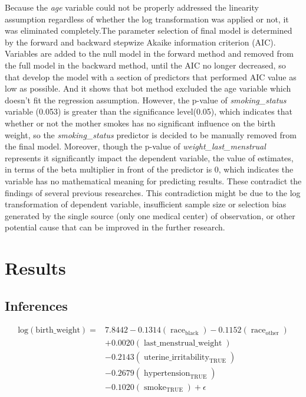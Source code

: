 \documentclass[9pt,twocolumn,twoside,]{pnas-new}
\begin{document}
Because the \emph{age} variable could not be properly addressed the
linearity assumption regardless of whether the log transformation was
applied or not, it was eliminated completely.The parameter selection of
final model is determined by the forward and backward stepwize Akaike
information criterion (AIC). Variables are added to the null model in
the forward method and removed from the full model in the backward
method, until the AIC no longer decreased, so that develop the model
with a section of predictors that performed AIC value as low as
possible. And it shows that bot method excluded the age variable which
doesn't fit the regression assumption. However, the p-value of
\emph{smoking\_status} variable (0.053) is greater than the significance
level(0.05), which indicates that whether or not the mother smokes has
no significant influence on the birth weight, so the
\emph{smoking\_status} predictor is decided to be manually removed from
the final model. Moreover, though the p-value of
\emph{weight\_last\_menstrual} represents it significantly impact the
dependent variable, the value of estimates, in terms of the beta
multiplier in front of the predictor is 0, which indicates the variable
has no mathematical meaning for predicting results. These contradict the
findings of several previous researches. This contradiction might be due
to the log transformation of dependent variable, insufficient sample
size or selection bias generated by the single source (only one medical
center) of observation, or other potential cause that can be improved in
the further research.

\hypertarget{results}{%
\section*{Results}\label{results}}

\hypertarget{inferences}{%
\subsection*{Inferences}\label{inferences}}

\[\begin{aligned}
\operatorname{log(birth\_weight)}=&7.8442-0.1314(\operatorname{race}_{\operatorname{black}})
                             -0.1152(\operatorname{race}_{\operatorname{other}})\\
                             &+0.0020(\operatorname{last\_menstrual\_weight})\\
                             &-0.2143(\operatorname{uterine\_irritability}_{\operatorname{TRUE}}) \\
                             &-0.2679(\operatorname{hypertension}_{\operatorname{TRUE}}) \\
                             &-0.1020(\operatorname{smoke}_{\operatorname{TRUE}})+\epsilon
\end{aligned} \]
\end{document}
